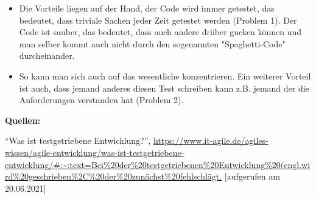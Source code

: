 \begin{enumerate}[(a)]
\begin{itemize}
    \item Die Vorteile liegen auf der Hand, der Code wird immer getestet, das bedeutet, dass triviale Sachen jeder Zeit getestet werden (Problem 1). Der Code ist sauber, das bedeutet, dass auch andere drüber gucken können und man selber kommt auch nicht durch den sogenannten "Spaghetti-Code" durcheinander.
    \item  So kann man sich auch auf das wesentliche konzentrieren.
Ein weiterer Vorteil ist auch, dass jemand anderes diesen Test schreiben kann z.B. jemand der die Anforderungen verstanden hat (Problem 2).
\end{itemize}
\end{enumerate}
\textbf{Quellen:} \\
    \item ``Was ist testgetriebene Entwicklung?'', \url{https://www.it-agile.de/agiles-wissen/agile-entwicklung/was-ist-testgetriebene-entwicklung/#:~:text=Bei%20der%20testgetriebenen%20Entwicklung%20(engl,wird%20geschrieben%2C%20der%20zunächst%20fehlschlägt.} [aufgerufen am 20.06.2021]
